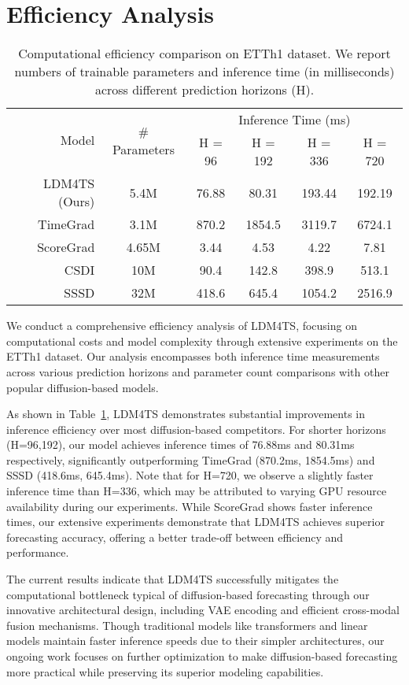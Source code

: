 \section{Efficiency Analysis}
\label{appx:efficiency}
\begin{table}[h]
\centering
\caption{Computational efficiency comparison on ETTh1 dataset. We report numbers of trainable parameters and inference time (in milliseconds) across different prediction horizons (H).}
\label{tab:efficiency}
\begin{tabular}{r|c|cccc}
\toprule
\multirow{2}{*}{Model} & \multirow{2}{*}{\# Parameters} & \multicolumn{4}{c}{Inference Time (ms)} \\
\cmidrule{3-6}
& & H = 96 & H = 192 & H = 336 & H = 720 \\
\midrule
LDM4TS (Ours) & 5.4M & 76.88 & 80.31 & 193.44 & 192.19 \\
\midrule
TimeGrad & 3.1M & 870.2 & 1854.5 & 3119.7 & 6724.1 \\
ScoreGrad & 4.65M & 3.44 & 4.53 & 4.22 & 7.81 \\ 
CSDI & 10M & 90.4 & 142.8 & 398.9 & 513.1 \\
SSSD & 32M & 418.6 & 645.4 & 1054.2 & 2516.9 \\
\bottomrule
\end{tabular}
\end{table}

We conduct a comprehensive efficiency analysis of LDM4TS, focusing on computational costs and model complexity through extensive experiments on the ETTh1 dataset. Our analysis encompasses both inference time measurements across various prediction horizons and parameter count comparisons with other popular diffusion-based models.

As shown in Table~\ref{tab:efficiency}, LDM4TS demonstrates substantial improvements in inference efficiency over most diffusion-based competitors. For shorter horizons (H=96,192), our model achieves inference times of 76.88ms and 80.31ms respectively, significantly outperforming TimeGrad (870.2ms, 1854.5ms) and SSSD (418.6ms, 645.4ms). Note that for H=720, we observe a slightly faster inference time than H=336, which may be attributed to varying GPU resource availability during our experiments. While ScoreGrad shows faster inference times, our extensive experiments demonstrate that LDM4TS achieves superior forecasting accuracy, offering a better trade-off between efficiency and performance.

The current results indicate that LDM4TS successfully mitigates the computational bottleneck typical of diffusion-based forecasting through our innovative architectural design, including VAE encoding and efficient cross-modal fusion mechanisms. Though traditional models like transformers and linear models maintain faster inference speeds due to their simpler architectures, our ongoing work focuses on further optimization to make diffusion-based forecasting more practical while preserving its superior modeling capabilities.